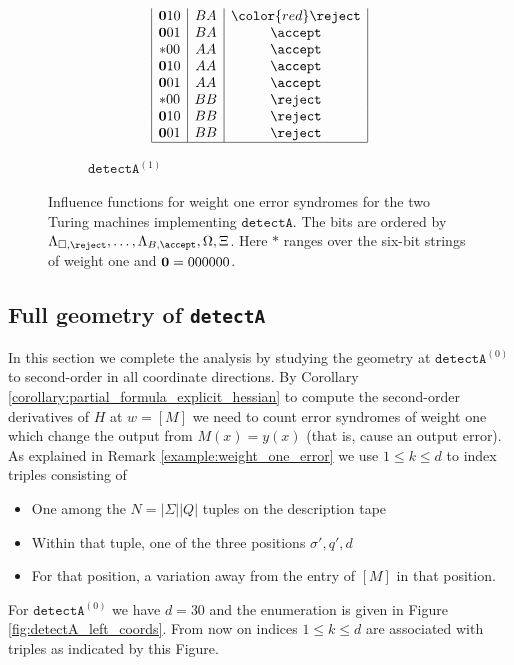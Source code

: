 \documentclass[english,letter paper,12pt,reqno]{article}
\theoremstyle{definition}
\newcommand{\detectA}{\texttt{detectA}}
\begin{document}
\begin{figure}[htbp]
\begin{subfigure}[b]{0.45\textwidth}
$$\begin{array}{|c|c|c|}
\bold{0}10 & BA & {\color{red} \reject} \\
\bold{0}01 & BA & \accept \\
*00 & AA & \accept \\
\bold{0}10 & AA & \accept \\
\bold{0}01 & AA & \accept \\
*00 & BB & \reject \\
\bold{0}10 & BB & \reject \\
\bold{0}01 & BB & \reject \\
\hline
\end{array}
$$
        \caption{$\detectA^{(1)}$}
        \label{fig:detectA_right_syndromes}
    \end{subfigure}
    \caption{Influence functions for weight one error syndromes for the two Turing machines implementing $\detectA$. The bits are ordered by $\Lambda_{\Box,\reject},\ldots,\Lambda_{B,\accept},\Omega,\Xi$. Here $*$ ranges over the six-bit strings of weight one and $\bold{0} = 000000$.}
    \label{fig:detectA_syndromes}
\end{figure}

\subsection{Full geometry of \detectA}\label{section:full_geometry}

In this section we complete the analysis by studying the geometry at $\detectA^{(0)}$ to second-order in all coordinate directions. By Corollary \ref{corollary:partial_formula_explicit_hessian} to compute the second-order derivatives of $H$ at $w = [M]$ we need to count error syndromes of weight one which change the output from $M(x) = y(x)$ (that is, cause an output error). As explained in Remark \ref{example:weight_one_error} we use $1 \le k \le d$ to index triples consisting of
\begin{itemize}
    \item One among the $N = |\Sigma||Q|$ tuples on the description tape
    \item Within that tuple, one of the three positions $\sigma',q',d$
    \item For that position, a variation away from the entry of $[M]$ in that position.
\end{itemize}
For $\detectA^{(0)}$ we have $d = 30$ and the enumeration is given in Figure \ref{fig:detectA_left_coords}. From now on indices $1 \le k \le d$ are associated with triples as indicated by this Figure.
\end{document}
